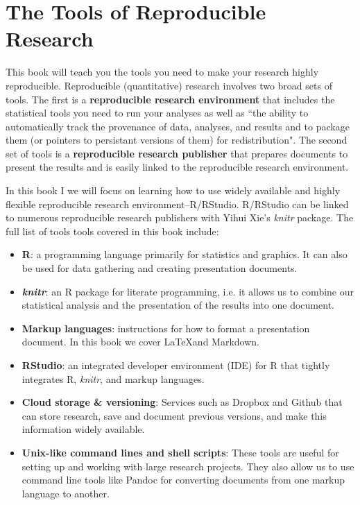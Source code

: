 \documentclass[ChapterTOCs,krantz1]{krantz}\usepackage{graphicx, color}
\begin{document}
\section{The Tools of Reproducible Research}

This book will teach you the tools you need to make your research highly reproducible. Reproducible (quantitative) research involves two broad sets of tools. The first is a {\bf{reproducible research environment}} that includes the statistical tools you need to run your analyses as well as ``the ability to automatically track the provenance of data, analyses, and results and to package them (or pointers to persistant versions of them) for redistribution". The second set of tools is a {\bf{reproducible research publisher}} that prepares documents to present the results and is easily linked to the reproducible research environment.\cite{Mesirov2010}

In this book I we will focus on learning how to use widely available and highly flexible reproducible research environment--R/RStudio. R/RStudio can be linked to numerous reproducible research publishers with Yihui Xie's {\emph{knitr}} package. The full list of tools tools covered in this book include:

\begin{itemize}
    \item {\bf{R}}: a programming language primarily for statistics and graphics. It can also be used for data gathering and creating presentation documents.
    
    \item {\bf{{\emph{knitr}}}}: an R package for literate programming, i.e. it allows us to combine our statistical analysis and the presentation of the results into one document.
    
    \item {\bf{Markup languages}}: instructions for how to format a presentation document. In this book we cover \LaTeX and Markdown.  
    
    \item {\bf{RStudio}}: an integrated developer environment (IDE) for R that tightly integrates R, {\emph{knitr}}, and markup languages.
    
    \item {\bf{Cloud storage \& versioning}}: Services such as Dropbox and Github that can store research, save and document previous versions, and make this information widely available.
    
    \item {\bf{Unix-like command lines and shell scripts}}: These tools are useful for setting up and working with large research projects. They also allow us to use command line tools like Pandoc for converting documents from one markup language to another.
\end{itemize}
\end{document}
